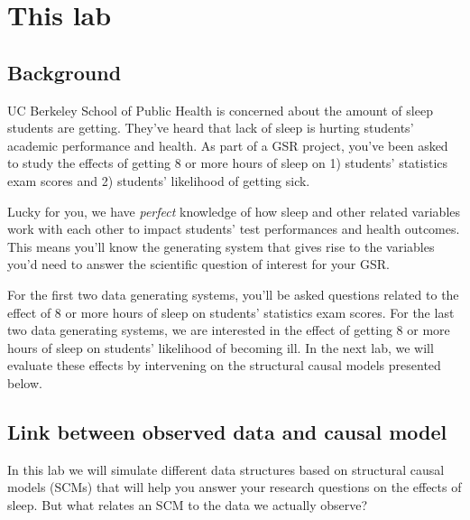 \documentclass[answers]{exam}
\begin{document}
\section{This lab}

\subsection{Background}

UC Berkeley School of Public Health is concerned about the amount of sleep students are getting. They've heard that lack of sleep is hurting students' academic performance and health. As part of a GSR project, you've been asked to study the effects of getting 8 or more hours of sleep on 1) students' statistics exam scores and 2) students' likelihood of getting sick. 

\noindent Lucky for you, we have \textit{perfect} knowledge of how sleep and other related variables work with each other to  impact students' test performances and health outcomes. This means you'll know the generating system that gives rise to the variables you'd need to answer the scientific question of interest for your GSR.

\noindent For the first two data generating systems, you'll be asked questions related to the effect of 8 or more hours of sleep on students' statistics exam scores. For the last two data generating systems, we are interested in the effect of getting 8 or more hours of sleep on students' likelihood of becoming ill. In the next lab, we will evaluate these effects by intervening on the structural causal models presented below.

\subsection{Link between observed data and causal model}

In this lab we will simulate different data structures based on structural causal models (SCMs) that will help you answer your research questions on the effects of sleep. But what relates an SCM to the data we actually observe? 
\end{document}
